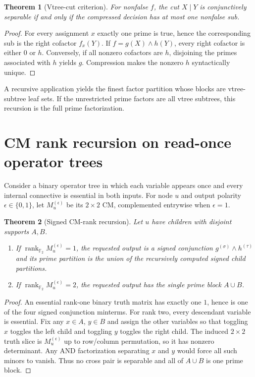 \documentclass[11pt]{article}
\newtheorem{theorem}{Theorem}
\newcommand{\F}{\mathbb F}
\begin{document}
\begin{theorem}[Vtree-cut criterion]
For nonfalse $f$, the cut $X\mid Y$ is conjunctively separable if and only if the compressed decision has at most one nonfalse sub.
\end{theorem}
\begin{proof}
For every assignment $x$ exactly one prime is true, hence the corresponding sub is the right cofactor $f_x(Y)$.  If $f=g(X)\land h(Y)$, every right cofactor is either $0$ or $h$.  Conversely, if all nonzero cofactors are $h$, disjoining the primes associated with $h$ yields $g$.  Compression makes the nonzero $h$ syntactically unique.
\end{proof}

A recursive application yields the finest factor partition whose blocks are vtree-subtree leaf sets.  If the unrestricted prime factors are all vtree subtrees, this recursion is the full prime factorization.

\section{CM rank recursion on read-once operator trees}
Consider a binary operator tree in which each variable appears once and every internal connective is essential in both inputs.  For node $u$ and output polarity $\epsilon\in\{0,1\}$, let $M_u^{(\epsilon)}$ be its $2\times2$ CM, complemented entrywise when $\epsilon=1$.

\begin{theorem}[Signed CM-rank recursion]
Let $u$ have children with disjoint supports $A,B$.
\begin{enumerate}
\item If $\operatorname{rank}_{\F_2}M_u^{(\epsilon)}=1$, the requested output is a signed conjunction $g^{(\sigma)}\land h^{(\tau)}$ and its prime partition is the union of the recursively computed signed child partitions.
\item If $\operatorname{rank}_{\F_2}M_u^{(\epsilon)}=2$, the requested output has the single prime block $A\cup B$.
\end{enumerate}
\end{theorem}
\begin{proof}
An essential rank-one binary truth matrix has exactly one $1$, hence is one of the four signed conjunction minterms.  For rank two, every descendant variable is essential.  Fix any $x\in A$, $y\in B$ and assign the other variables so that toggling $x$ toggles the left child and toggling $y$ toggles the right child.  The induced $2\times2$ truth slice is $M_u^{(\epsilon)}$ up to row/column permutation, so it has nonzero determinant.  Any AND factorization separating $x$ and $y$ would force all such minors to vanish.  Thus no cross pair is separable and all of $A\cup B$ is one prime block.
\end{proof}
\end{document}
